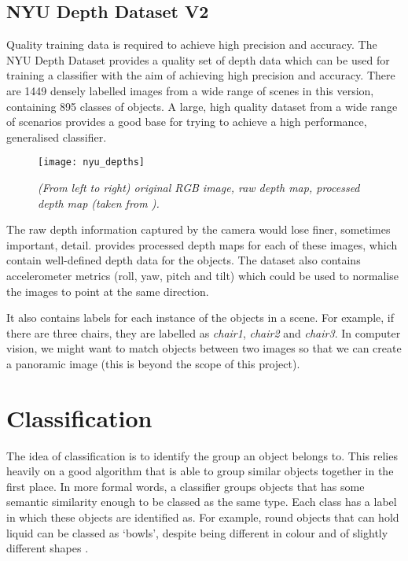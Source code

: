 
\subsection{NYU Depth Dataset V2 \protect\cite{nyu-dataset}}
Quality training data is required to achieve high precision and accuracy. The NYU Depth Dataset provides a quality set of depth data which can be used for training a classifier with the aim of achieving high precision and accuracy. There are 1449 densely labelled images from a wide range of scenes in this version, containing 895 classes of objects. A large, high quality dataset from a wide range of scenarios provides a good base for trying to achieve a high performance, generalised classifier.

\begin{figure}[h]
  \centering
  \texttt{[image: nyu\_depths]}
  \caption{\textit{(From left to right) original RGB image, raw depth map, processed depth map (taken from \protect{}).}}
  \label{fig:nyu_depths}
\end{figure}

The raw depth information captured by the camera would lose finer, sometimes important, detail.  provides processed depth maps for each of these images,  which contain well-defined depth data for the objects. The dataset also contains accelerometer metrics (roll, yaw, pitch and tilt) which could be used to normalise the images to point at the same direction.

It also contains labels for each instance of the objects in a scene. For example, if there are three chairs, they are labelled as \textit{chair1}, \textit{chair2} and \textit{chair3}. In computer vision, we might want to match objects between two images so that we can create a panoramic image (this is beyond the scope of this project).


\newpage

\section{Classification} \label{sec:classification}
The idea of classification is to identify the group an object belongs to. This relies heavily on a good algorithm that is able to group similar objects together in the first place. In more formal words, a classifier groups objects that has some semantic similarity enough to be classed as the same type. Each class has a label in which these objects are identified as. For example, round objects that can hold liquid can be classed as `bowls', despite being different in colour and of slightly different shapes \cite{hall-notes}. 


